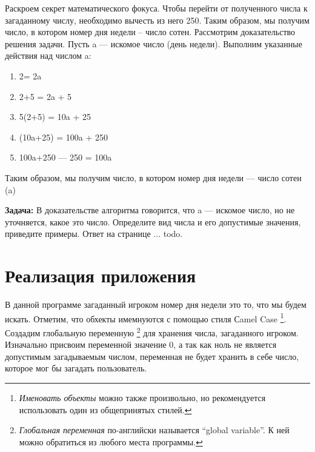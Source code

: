 Раскроем секрет математического фокуса.
Чтобы перейти от полученного числа к загаданному числу, необходимо вычесть из него 250. Таким образом, мы получим число, в котором номер дня недели – число сотен. Рассмотрим доказательство решения задачи. Пусть {a} — искомое число (день недели). Выполним указанные действия над числом {a}:
\begin{enumerate}
   \item 2\cdota = 2a

   \item 2\cdota+5 = 2a + 5

   \item 5\cdot(2\cdota+5) = 10a + 25
 
   \item (10a+25) = 100a + 250
 
   \item 100a+250 — 250 = 100a
\end{enumerate}

Таким образом, мы получим число, в котором номер дня недели — число сотен ({{a}})

\textbf{Задача:} В доказательстве алгоритма говорится, что  {a} — искомое число, но не уточняется, какое это число. Определите вид числа и его допустимые значения, приведите примеры.  Ответ на странице ... todo.

\section{Реализация приложения}

В данной программе \cite{PanfilovaApp} загаданный игроком номер дня недели это то, что мы будем искать.
Отметим, что обхекты имемнуются с помощью стиля Сamel Case \footnote[][-0cm]{ \emph{Именовать объекты} 
можно также произвольно, но рекомендуется использовать один из общепринятых стилей.
}. 
Создадим глобальную переменную \footnote[][-0cm]{ \emph{Глобальная переменная} по-английски 
называется ``global variable''. К ней можно обратиться из любого места программы. 
}   для хранения числа, загаданного игроком. Изначально присвоим переменной значение 0, а так как ноль не является допустимым загадываемым числом, переменная не будет хранить в себе число, которое мог бы загадать пользователь.

